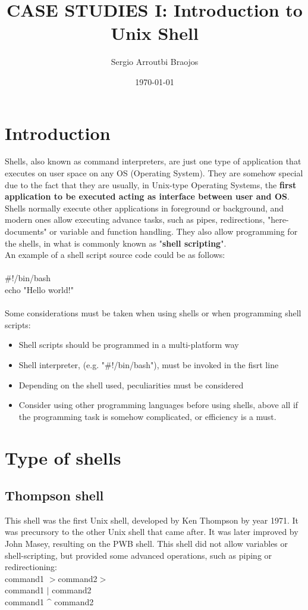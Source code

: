 \documentclass[11pt]{article}
\title{\textbf{CASE STUDIES I: Introduction to Unix Shell}}
\author{Sergio Arroutbi Braojos}
\date{\today}
\begin{document}
\maketitle

\section{Introduction}
Shells, also known as command interpreters, are just one type of application that executes on user space on any OS (Operating System). They are somehow special due to the fact that they are usually, in Unix-type Operating Systems, the \textbf{first application to be executed acting as interface between user and OS}.\\
Shells normally execute other applications in foreground or background, and modern ones allow executing advance tasks, such as pipes, redirections, "here-documents" or variable and function handling. They also allow programming for the shells, in what is commonly known as "\textbf{shell scripting}".\\
An example of a shell script source code could be as follows:\\
\\
\#!/bin/bash\\
echo "Hello world!"\\
\\
Some considerations must be taken when using shells or when programming shell scripts:
\begin{itemize}
\item{Shell scripts should be programmed in a multi-platform way}
\item{Shell interpreter, (e.g. "\#!/bin/bash"), must be invoked in the fisrt line}
\item{Depending on the shell used, peculiarities must be considered}
\item{Consider using other programming languages before using shells, above all if the programming task is somehow complicated, or efficiency is a must.}
\end{itemize}
\section{Type of shells}
\subsection{Thompson shell}
This shell was the first Unix shell, developed by Ken Thompson by year 1971. It was precursory to the other Unix shell that came after. It was later improved by John Masey, resulting on the PWB shell. This shell did not allow variables or shell-scripting, but provided some advanced operations, such as piping or redirectioning:\\
command1 $>$command2$>$\\
command1 $|$ command2\\
command1 \^{} command2
\end{document}
